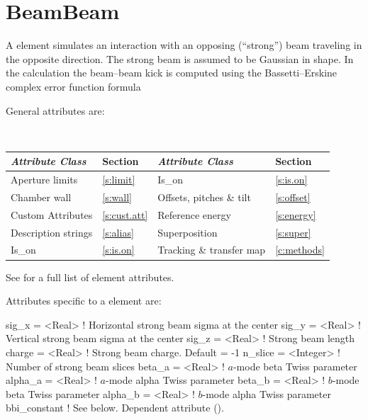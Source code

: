 \section{BeamBeam}
\label{s:bbi}

A  element simulates an interaction with an opposing
(``strong'') beam traveling in the opposite direction. The strong beam
is assumed to be Gaussian in shape. In the 
calculation the beam--beam kick is computed using the
Bassetti--Erskine complex error function formula\cite{b:talman}

General  attributes are:
\begin{center} 
\tt
\begin{tabular}{llll} \toprule
  {\sl Attribute Class}      & Section          & {\sl Attribute Class}      & Section         \\ \midrule
  Aperture limits            & \ref{s:limit}    & Is_on                      & \ref{s:is.on}   \\
  Chamber wall               & \ref{s:wall}     & Offsets, pitches \& tilt   & \ref{s:offset}  \\
  Custom Attributes          & \ref{s:cust.att} & Reference energy           & \ref{s:energy}  \\
  Description strings        & \ref{s:alias}    & Superposition              & \ref{s:super}   \\
  Is_on                      & \ref{s:is.on}    & Tracking \& transfer map   & \ref{c:methods} \\ 
  \bottomrule
\end{tabular}
\end{center}
\toffset
See  for a full list of element attributes.

Attributes specific to a  element are:
\begin{example}
  sig_x   = <Real>     ! Horizontal strong beam sigma at the center 
  sig_y   = <Real>     ! Vertical strong beam sigma at the center
  sig_z   = <Real>     ! Strong beam length
  charge  = <Real>     ! Strong beam charge. Default = -1
  n_slice = <Integer>  ! Number of strong beam slices
  beta_a  = <Real>     ! $a$-mode beta Twiss parameter
  alpha_a = <Real>     ! $a$-mode alpha Twiss parameter 
  beta_b  = <Real>     ! $b$-mode beta Twiss parameter
  alpha_b = <Real>     ! $b$-mode alpha Twiss parameter 
  bbi_constant         ! See below. Dependent attribute ().
\end{example}

